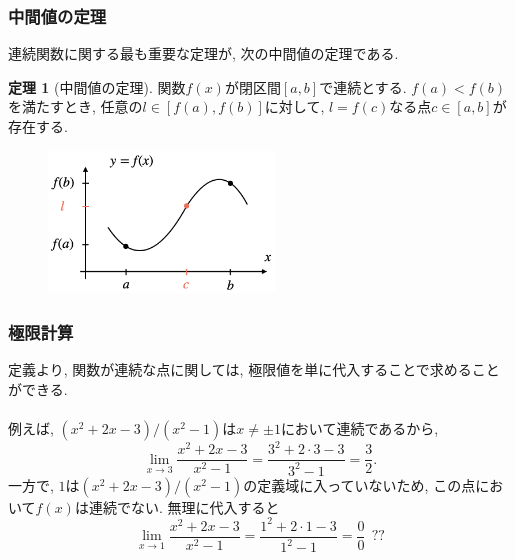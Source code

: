 \documentclass[dvipdfmx,cjk,10.2pt]{beamer}
\theoremstyle{definition}
\newtheorem{Thm}{定理}[section]
\begin{document}


\begin{frame}
\frametitle{中間値の定理} 

連続関数に関する最も重要な定理が, 次の中間値の定理である. 

\begin{Thm}[中間値の定理]
関数$f(x)$が閉区間$[a,b]$で連続とする. 
$f(a) <  f(b)$を満たすとき, 任意の$l \in [f(a), f(b)]$に対して, $l=f(c)$なる点$c \in [a,b]$が存在する. 
\end{Thm}

 \begin{figure}[htbp]
 \begin{center} 
  \includegraphics[width=60mm]{mean_value.png}
 \end{center}
\end{figure}


\end{frame}



\begin{frame}
\frametitle{極限計算} 



定義より, 関数が連続な点に関しては, 極限値を単に代入することで求めることができる. \\
\ \\

例えば, $(x^2+2x-3)/(x^2-1)$は$x\neq \pm1$において連続であるから, 
$$
\lim_{x \to 3} \frac{x^2+2x-3}{x^2-1}=\frac{3^2+2\cdot 3-3}{3^2-1}=\frac{3}{2}. 
$$
一方で, $1$は$(x^2+2x-3)/(x^2-1)$の定義域に入っていないため, この点において$f(x)$は連続でない. 
無理に代入すると
$$
\lim_{x \to 1} \frac{x^2+2x-3}{x^2-1}=\frac{1^2+2\cdot 1-3}{1^2-1}=\frac{0}{0} \ \ ?? 
$$
\end{frame}
\end{document}
